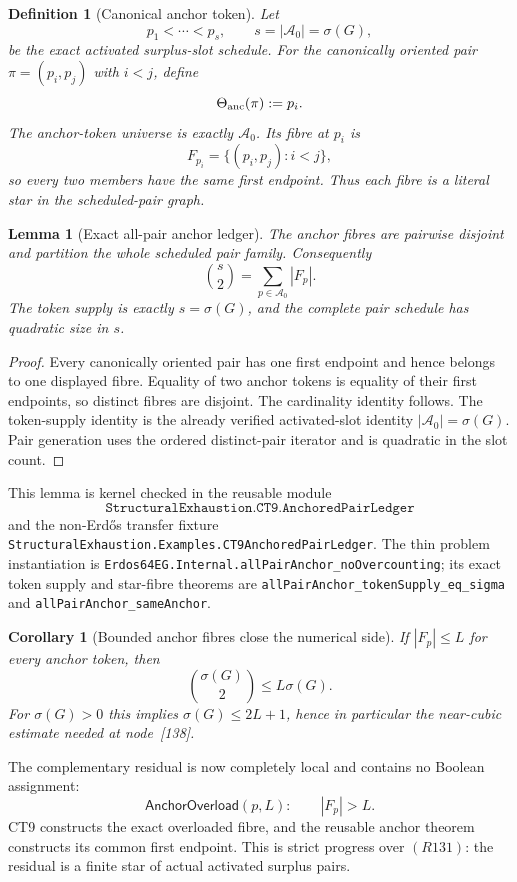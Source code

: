 \documentclass[11pt]{article}
\newtheorem{lemma}{Lemma}
\newtheorem{definition}{Definition}
\newtheorem{corollary}{Corollary}
\begin{document}
\begin{definition}[Canonical anchor token]
Let
\[
  p_1<\cdots<p_s,\qquad s=|\mathcal A_0|=\sigma(G),
\]
be the exact activated surplus-slot schedule.  For the canonically oriented
pair \(\pi=(p_i,p_j)\) with \(i<j\), define
\[
  \Theta_{\rm anc}(\pi):=p_i.
\]
The anchor-token universe is exactly \(\mathcal A_0\).  Its fibre at \(p_i\)
is
\[
  F_{p_i}=\{(p_i,p_j):i<j\},
\]
so every two members have the same first endpoint.  Thus each fibre is a
literal star in the scheduled-pair graph.
\end{definition}

\begin{lemma}[Exact all-pair anchor ledger]
The anchor fibres are pairwise disjoint and partition the whole scheduled
pair family.  Consequently
\[
  \binom{s}{2}=\sum_{p\in\mathcal A_0}|F_p|.
\]
The token supply is exactly \(s=\sigma(G)\), and the complete pair schedule
has quadratic size in \(s\).
\end{lemma}

\begin{proof}
Every canonically oriented pair has one first endpoint and hence belongs to
one displayed fibre.  Equality of two anchor tokens is equality of their
first endpoints, so distinct fibres are disjoint.  The cardinality identity
follows.  The token-supply identity is the already verified activated-slot
identity \(|\mathcal A_0|=\sigma(G)\).  Pair generation uses the ordered
distinct-pair iterator and is quadratic in the slot count.
\end{proof}

This lemma is kernel checked in the reusable module
\[
\texttt{StructuralExhaustion.CT9.AnchoredPairLedger}
\]
and the non-Erd\H{o}s transfer fixture
\texttt{StructuralExhaustion.Examples.CT9AnchoredPairLedger}.  The thin
problem instantiation is
\texttt{Erdos64EG.Internal.allPairAnchor\_noOvercounting}; its exact token
supply and star-fibre theorems are
\texttt{allPairAnchor\_tokenSupply\_eq\_sigma} and
\texttt{allPairAnchor\_sameAnchor}.

\begin{corollary}[Bounded anchor fibres close the numerical side]
If \(|F_p|\le L\) for every anchor token, then
\[
  \binom{\sigma(G)}2\le L\sigma(G).
\]
For \(\sigma(G)>0\) this implies \(\sigma(G)\le2L+1\), hence in
particular the near-cubic estimate needed at node~[138].
\end{corollary}

The complementary residual is now completely local and contains no Boolean
assignment:
\[
\mathsf{AnchorOverload}(p,L):\qquad |F_p|>L.
\tag{A131}
\]
CT9 constructs the exact overloaded fibre, and the reusable anchor theorem
constructs its common first endpoint.  This is strict progress over
\((R131)\): the residual is a finite star of actual activated surplus pairs.
\end{document}
